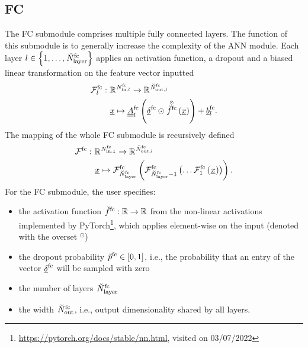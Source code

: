 \subsection*{FC}
The FC submodule comprises multiple fully connected layers.
The function of this submodule is to 
generally increase the complexity of the ANN module.
Each layer 
$
    l 
    \in 
    \left\{
        1, \dots, \num[\user]{\fc}{\layer}{}{}
    \right\}
$ 
applies
an activation function,
a dropout
and a biased linear transformation
on the feature vector inputted
\begin{align} \label{eq:fc_layer}
    \mathcal{F}^\text{fc}_l
    :\ &
    \mathbb{R}^{
        \num[]{\text{fc}}{\text{in}, l}{}{}
    }
    \rightarrow 
    \mathbb{R}^{
        \num[\user]{\text{fc}}{\text{out}, l}{}{}
        }
    \nonumber \\ &
    \underline{x}
    \mapsto
    \underline{\underline A}^\text{fc}_l
    \left(
        \underline{\delta}^\text{fc}
        \odot
        \overset{\scriptscriptstyle \odot}{\func[\user]{\fc}{}{}{}} \left(
            \underline{x}
        \right)
    \right)
    + \underline b^\text{fc}_l
    .
\end{align}
The mapping of the whole FC submodule is recursively defined
\begin{align} \label{eq:fc}
    \mathcal{F}^\text{fc}
    :\ &
    \mathbb{R}^{
        \num[]{\text{fc}}{\text{in}, 1}{}{}
    }
    \rightarrow 
    \mathbb{R}^{
        \num[\user]{\text{fc}}{\text{out}, l}{}{}
        }
    \nonumber \\ &
    \featvec[]{}{}{}{}
    \mapsto
    \mathcal{F}^\text{fc}_{\num[\user]{\fc}{\layer}{}{}} \left(
        \mathcal{F}^\text{fc}_{\num[\user]{\fc}{\layer}{}{} - 1} \left(
            \dots
            \mathcal{F}^\text{fc}_{1} \left(
                \featvec[]{}{}{}{}
            \right)    
        \right)
    \right)
    .
\end{align}
For the FC submodule,
the user specifies:
\begin{itemize}
    \item the activation function
    $\func[\user]{\fc}{}{}{}: \mathbb{R} \rightarrow \mathbb{R} $
    from the non-linear activations
    implemented by PyTorch\footnote{
        \url{https://pytorch.org/docs/stable/nn.html}, visited on 03/07/2022
    },
    which applies element-wise 
    on the input (denoted with the overset ${}^\odot$)
    \item the dropout probability 
    $\prob[\user]{\fc}{}{}{} \in [0,1]$,
    i.e., the probability that an entry of the vector 
    $\underline{\delta}^\fc$ will be sampled with zero
    \item the number of layers
    $
    \num[\user]{\fc}{\layer}{}{}
    $
    \item the width 
    $
    \num[\user]{\fc}{\outp}{}{}
    $,
    i.e., output dimensionality
    shared by all layers.
\end{itemize}
